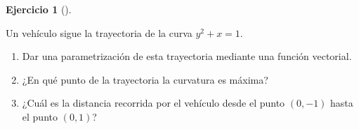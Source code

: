 \documentclass[
  spanish,
  a4paper,
]{scrreport}
\theoremstyle{definition}
\newtheorem{exercise}{Ejercicio}[chapter]
\theoremstyle{remark}
\begin{document}
\begin{exercise}[]\protect\hypertarget{exr-3}{}\label{exr-3}

Un vehículo sigue la trayectoria de la curva \(y^2+x=1\).

\begin{enumerate}
\def\labelenumi{\alph{enumi}.}
\item
  Dar una parametrización de esta trayectoria mediante una función
  vectorial.
\item
  ¿En qué punto de la trayectoria la curvatura es máxima?
\item
  ¿Cuál es la distancia recorrida por el vehículo desde el punto
  \((0, -1)\) hasta el punto \((0,1)\)?
\end{enumerate}

\end{exercise}
\end{document}
